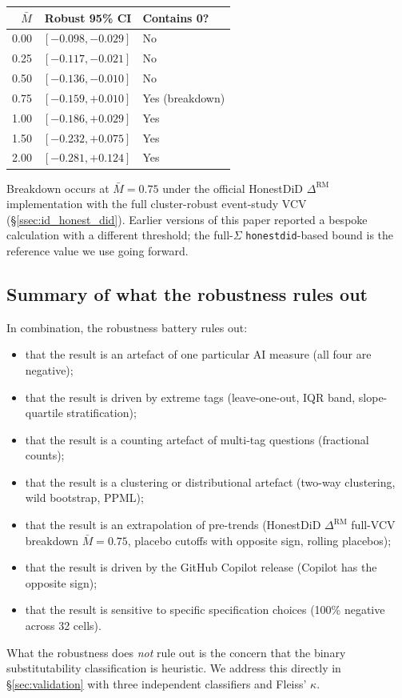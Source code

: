 \begin{center}
\small
\begin{tabular}{rrl}
\toprule
$\bar M$ & Robust 95\% CI & Contains 0? \\
\midrule
0.00 & $[-0.098, -0.029]$ & No \\
0.25 & $[-0.117, -0.021]$ & No \\
0.50 & $[-0.136, -0.010]$ & No \\
0.75 & $[-0.159, +0.010]$ & Yes (breakdown) \\
1.00 & $[-0.186, +0.029]$ & Yes \\
1.50 & $[-0.232, +0.075]$ & Yes \\
2.00 & $[-0.281, +0.124]$ & Yes \\
\bottomrule
\end{tabular}
\end{center}

Breakdown occurs at $\bar M = 0.75$ under the official
HonestDiD $\Delta^{\text{RM}}$ implementation with the
full cluster-robust event-study VCV
(\S\ref{ssec:id_honest_did}). Earlier versions of this
paper reported a bespoke calculation with a different
threshold; the full-$\Sigma$ \texttt{honestdid}-based
bound is the reference value we use going forward.

\subsection{Summary of what the robustness rules
out}\label{app:rob_summary}

In combination, the robustness battery rules out:
\begin{itemize}
\item that the result is an artefact of one particular AI
measure (all four are negative);
\item that the result is driven by extreme tags
(leave-one-out, IQR band, slope-quartile stratification);
\item that the result is a counting artefact of multi-tag
questions (fractional counts);
\item that the result is a clustering or distributional
artefact (two-way clustering, wild bootstrap, PPML);
\item that the result is an extrapolation of pre-trends
(HonestDiD $\Delta^{\text{RM}}$ full-VCV breakdown
$\bar M = 0.75$, placebo cutoffs with opposite sign,
rolling placebos);
\item that the result is driven by the GitHub Copilot
release (Copilot has the opposite sign);
\item that the result is sensitive to specific specification
choices (100\% negative across 32 cells).
\end{itemize}
What the robustness does \emph{not} rule out is the
concern that the binary substitutability classification is
heuristic. We address this directly in
\S\ref{sec:validation} with three independent classifiers
and Fleiss' $\kappa$.
